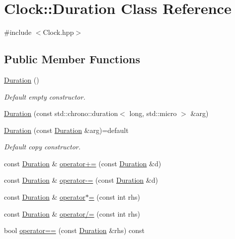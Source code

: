 \hypertarget{class_clock_1_1_duration}{}\section{Clock\+:\+:Duration Class Reference}
\label{class_clock_1_1_duration}


{\ttfamily \#include $<$Clock.\+hpp$>$}

\subsection*{Public Member Functions}
\begin{DoxyCompactItemize}
\item 
\hyperlink{class_clock_1_1_duration_a88c346b0ca4555b84ea38acb7c6e7a51}{Duration} ()
\begin{DoxyCompactList}\small\item\em Default empty constructor. \end{DoxyCompactList}\item 
\hyperlink{class_clock_1_1_duration_a4d25fcf2509674b1b3730f6328a71d3e}{Duration} (const std\+::chrono\+::duration$<$ long, std\+::micro $>$ \&arg)
\item 
\hyperlink{class_clock_1_1_duration_aa5a9a80d7d943cd54b0f89bdb6c9af8c}{Duration} (const \hyperlink{class_clock_1_1_duration}{Duration} \&arg)=default
\begin{DoxyCompactList}\small\item\em Default copy constructor. \end{DoxyCompactList}\item 
const \hyperlink{class_clock_1_1_duration}{Duration} \& \hyperlink{class_clock_1_1_duration_a26e61beba69d48791344c4ad41cfba24}{operator+=} (const \hyperlink{class_clock_1_1_duration}{Duration} \&d)
\item 
const \hyperlink{class_clock_1_1_duration}{Duration} \& \hyperlink{class_clock_1_1_duration_adcaee82baaaf942f67483582c7e1f1e6}{operator-\/=} (const \hyperlink{class_clock_1_1_duration}{Duration} \&d)
\item 
const \hyperlink{class_clock_1_1_duration}{Duration} \& \hyperlink{class_clock_1_1_duration_a88c694eff07a588782593d4617482919}{operator$\ast$=} (const int rhs)
\item 
const \hyperlink{class_clock_1_1_duration}{Duration} \& \hyperlink{class_clock_1_1_duration_a60cab1e0be9e835a05a4b81eb792abe2}{operator/=} (const int rhs)
\item 
bool \hyperlink{class_clock_1_1_duration_afeeb3847f2147769416471892ef04af9}{operator==} (const \hyperlink{class_clock_1_1_duration}{Duration} \&rhs) const 

\end{DoxyCompactItemize}

